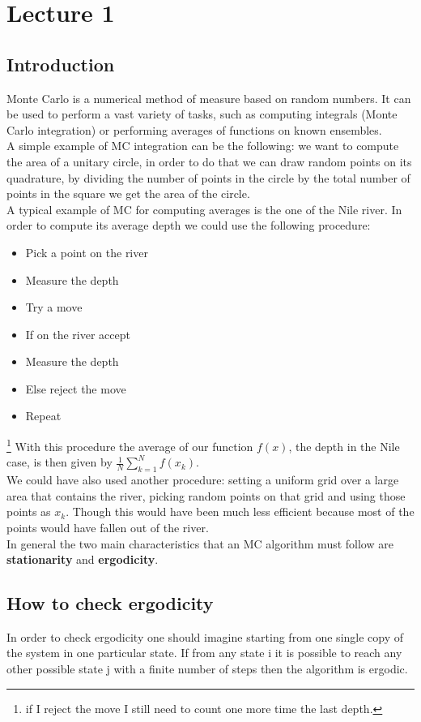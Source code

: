 \section{Lecture 1}
\subsection{Introduction}
Monte Carlo is a numerical method of measure based on random numbers. It can be used to perform a vast variety of tasks, such as computing integrals (Monte Carlo integration) or performing averages of functions on known ensembles. \\
A simple example of MC integration can be the following:
we want to compute the area of a unitary circle, in order to do that we can draw random points on its quadrature, by dividing the number of points in the circle by the total number of points in the square we get the area of the circle. \\
A typical example of MC for computing averages is the one of the Nile river. In order to compute its average depth we could use the following procedure:
\begin{itemize}
    \item Pick a point on the river
    \item Measure the depth
    \item Try a move
    \item If on the river accept
    \item Measure the depth
    \item Else reject the move
    \item Repeat
\end{itemize}
\footnote{if I reject the move I still need to count one more time the last depth.}
With this procedure the average of our function $f\left(x\right)$, the depth in the Nile case, is then given by $\frac{1}{N} \sum_{k=1}^N f \left(x_k\right)$.\\
We could have also used another procedure: setting a uniform grid over a large area that contains the river, picking random points on that grid and using those points as $x_k$. Though this would have been much less efficient because most of the points would have fallen out of the river.
\smallskip
\\
In general the two main characteristics that an MC algorithm must follow are \textbf{stationarity} and \textbf{ergodicity}.
 \subsection{How to check ergodicity}
In order to check ergodicity one should imagine starting from one single copy of the system in one particular state. If from any state i it is possible to reach any other possible state j with a finite number of steps then the algorithm is ergodic.
